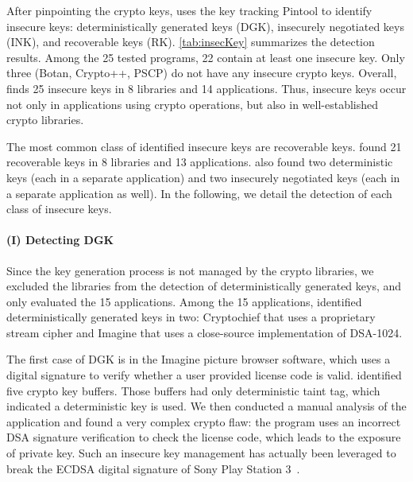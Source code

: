 After pinpointing the crypto keys, \sysname uses the key tracking Pintool to identify  insecure keys: deterministically generated keys (DGK), insecurely negotiated keys (INK), and recoverable keys (RK). \autoref{tab:insecKey} summarizes the detection results. Among the 25 tested programs, 22 contain at least one insecure key. Only three (\textsf{\small Botan}, \textsf{\small Crypto++}, \textsf{\small PSCP}) do not have any insecure crypto keys. Overall, \sysname finds 25 insecure keys in 8 libraries and 14 applications.
Thus, insecure keys occur not only in applications using crypto operations, but also in well-established crypto libraries.

The most common class of identified insecure keys are recoverable keys. 
\sysname found 21 recoverable keys in 8 libraries and  13 applications. 
\sysname also found two deterministic keys (each in a separate application) and two insecurely negotiated keys (each in a separate application as well).
%
In the following, we detail the detection of each class of insecure keys.

\paragraph{\bf{(I) Detecting DGK}}\label{sec:eval:keygen}
Since the key generation process is not managed by the crypto libraries, we excluded the libraries from the detection of deterministically generated keys, and only evaluated the 15 applications. 
Among the 15 applications, \sysname identified deterministically generated keys in two: \textsf{\small Cryptochief} that uses a proprietary stream cipher and \textsf{\small Imagine} that uses a close-source implementation of DSA-1024.

The first case of DGK is in the  \textsf{\small Imagine} picture browser software, which uses a digital signature to verify whether a user provided license code is valid.
\sysname identified five crypto key buffers. Those buffers had only deterministic taint tag, which indicated a deterministic key is used.
We then conducted a manual analysis of the application and found a very complex crypto flaw:
	the program uses an incorrect \textsf{\small DSA} signature verification to check the license code,
    which leads to the exposure of private key.
Such an insecure key management has actually been leveraged to break the \textsf{\small ECDSA} digital signature of Sony Play Station 3~\cite{ecdsa2010ps3}. %

